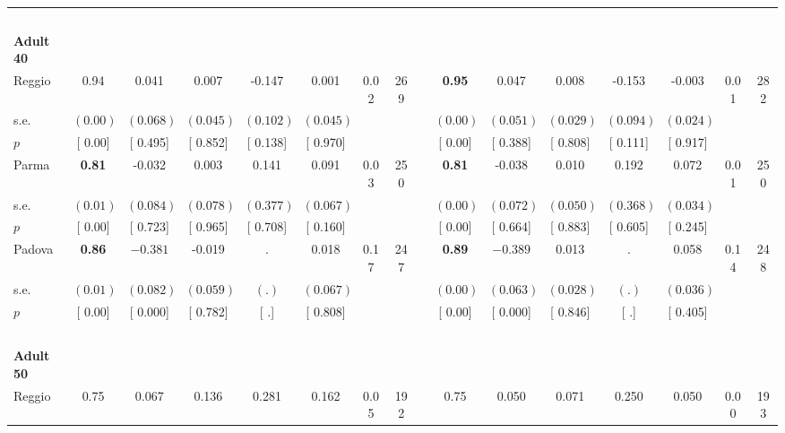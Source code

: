 \begin{longtable}{L{8em} c c c c c c c p{1em} c c c c c c c}
~\\[1em]
\quad \quad \textbf{Adult 40} & & & & & & & & & & & & & & & \\* 
\quad \quad \quad Reggio& 0.94 &     0.041 &     0.007 &    -0.147 &     0.001 &      0.02 &       269 & & \textbf{     0.95} &     0.047 &     0.008 &    -0.153 &    -0.003 &      0.01 &       282  \\*
\quad \quad \quad \quad s.e.& $ (     0.00)$ & $ (    0.068)$ & $ (    0.045)$ & $ (    0.102)$ & $ (    0.045)$ & & & & $ (     0.00)$ & $ (    0.051)$ & $ (    0.029)$ & $ (    0.094)$ & $ (    0.024)$ & &  \\*
\quad \quad \quad \quad $ p$ & [     0.00] & [    0.495] & [    0.852] & [    0.138] & [    0.970] & & & & [     0.00] & [    0.388] & [    0.808] & [    0.111] & [    0.917] & &  \\[1em]
\quad \quad \quad Parma& \textbf{     0.81} &    -0.032 &     0.003 &     0.141 &     0.091 &      0.03 &       250 & & \textbf{     0.81} &    -0.038 &     0.010 &     0.192 &     0.072 &      0.01 &       250  \\*
\quad \quad \quad \quad s.e.& $ (     0.01)$ & $ (    0.084)$ & $ (    0.078)$ & $ (    0.377)$ & $ (    0.067)$ & & & & $ (     0.00)$ & $ (    0.072)$ & $ (    0.050)$ & $ (    0.368)$ & $ (    0.034)$ & &  \\*
\quad \quad \quad \quad $ p$ & [     0.00] & [    0.723] & [    0.965] & [    0.708] & [    0.160] & & & & [     0.00] & [    0.664] & [    0.883] & [    0.605] & [    0.245] & &  \\[1em]
\quad \quad \quad Padova& \textbf{     0.86} & $ \mathbf{   -0.381}$ &    -0.019 &         . &     0.018 &      0.17 &       247 & & \textbf{     0.89} & $ \mathbf{   -0.389}$ &     0.013 &         . &     0.058 &      0.14 &       248  \\*
\quad \quad \quad \quad s.e.& $ (     0.01)$ & $ (    0.082)$ & $ (    0.059)$ & $ (        .)$ & $ (    0.067)$ & & & & $ (     0.00)$ & $ (    0.063)$ & $ (    0.028)$ & $ (        .)$ & $ (    0.036)$ & &  \\*
\quad \quad \quad \quad $ p$ & [     0.00] & [    0.000] & [    0.782] & [        .] & [    0.808] & & & & [     0.00] & [    0.000] & [    0.846] & [        .] & [    0.405] & &  \\[1em]
~\\[1em]
\quad \quad \textbf{Adult 50} & & & & & & & & & & & & & & & \\* 
\quad \quad \quad Reggio& 0.75 &     0.067 &     0.136 &     0.281 &     0.162 &      0.05 &       192 & & 0.75 &     0.050 &     0.071 &     0.250 &     0.050 &      0.00 &       193  \\*

\end{longtable}
